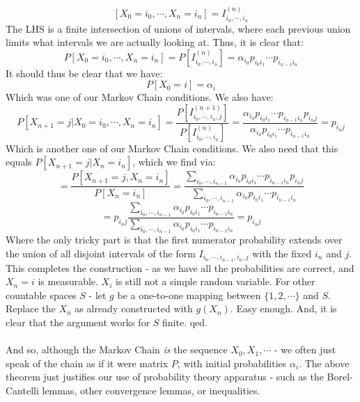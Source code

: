 \documentclass[12pt,a4paper]{article}
\newcommand{\1}[1]{\mathbbm{1}\left\{ #1 \right\}}
\begin{document}
$$
	[X_0 = i_0, \cdots, X_n = i_n] = I_{i_0, \cdots, i_n}^{(n)}
$$
The LHS is a finite intersection of unions of intervals, where each previous union limits what intervals we are actually looking at. Thus, it is clear that:
$$
	P\left[X_0 = i_0, \cdots, X_n = i_n\right] = P\left[I_{i_0, \cdots, i_n}^{(n)}\right] =
	\alpha_{i_0}p_{i_0i_1} \cdots p_{i_{n-1}i_n}
$$
It should thus be clear that we have:
$$
	P\left[X_0 = i\right] = \alpha_i
$$
Which was one of our Markov Chain conditions. We also have:
$$
	P\left[X_{n+1} = j | X_0 = i_0, \cdots, X_n = i_n\right] = 
	\frac{P\left[I_{i_0, \cdots, i_n,j}^{(n+1)}\right]}{P\left[I_{i_0, \cdots, i_n}^{(n)}\right]} =
	\frac{\alpha_{i_0}p_{i_0i_1} \cdots p_{i_{n-1}i_n} p_{i_nj}}{\alpha_{i_0}p_{i_0i_1} \cdots p_{i_{n-1}i_n}} =
	p_{i_nj}
$$
Which is another one of our Markov Chain conditions. We also need that this equals $P[X_{n+1} = j | X_n = i_n]$, which we find via:
$$
	= \frac{P\left[X_{n+1} = j, X_n = i_n\right]}{P\left[X_n = i_n\right]} =
	\frac
	{\sum_{i_0, \cdots, i_{n-1}} \alpha_{i_0}p_{i_0i_1} \cdots p_{i_{n-1}i_n}p_{i_nj}}
	{\sum_{i_0, \cdots, i_{n-1}} \alpha_{i_0}p_{i_0i_1} \cdots p_{i_{n-1}i_n}} 
$$
$$
	=
	p_{i_nj}
	\frac
	{\sum_{i_0, \cdots, i_{n-1}} \alpha_{i_0}p_{i_0i_1} \cdots p_{i_{n-1}i_n}}
	{\sum_{i_0, \cdots, i_{n-1}} \alpha_{i_0}p_{i_0i_1} \cdots p_{i_{n-1}i_n}} =
	p_{i_nj}
$$
Where the only tricky part is that the first numerator probability extends over the union of all disjoint intervals of the form $I_{i_0, \cdots, i_{n-1}, i_n, j}$ with the fixed $i_n$ and $j$. This completes the construction - as we have all the probabilities are correct, and $X_n = i$ is measurable. $X_i$ is still not a simple random variable. For other countable spaces $S$ - let $g$ be a one-to-one mapping between $\{1, 2, \cdots\}$ and $S$. Replace the $X_n$ as already constructed with $g(X_n)$. Easy enough. And, it is clear that the argument works for $S$ finite. qed.
\\\\
And so, although the Markov Chain \textit{is} the sequence $X_0, X_1, \cdots$ - we often just speak of the chain as if it were matrix $P$, with initial probabilities $\alpha_i$. The above theorem just justifies our use of probability theory apparatus - such as the Borel-Cantelli lemmas, other convergence lemmas, or inequalities.
\end{document}
